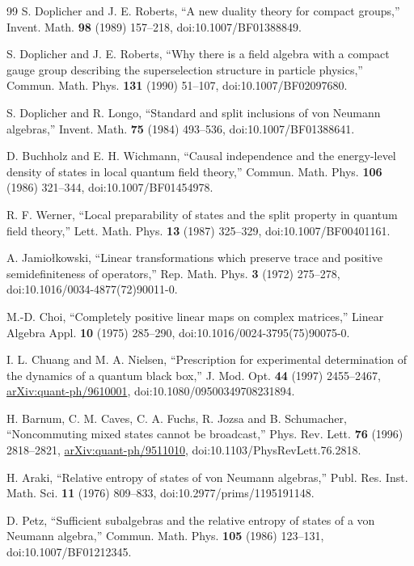 \documentclass[12pt]{article}
\theoremstyle{definition}
\theoremstyle{remark}
\begin{document}
\begin{thebibliography}{99}
S. Doplicher and J. E. Roberts,
``A new duality theory for compact groups,''
Invent. Math. \textbf{98} (1989) 157--218,
doi:10.1007/BF01388849.

S. Doplicher and J. E. Roberts,
``Why there is a field algebra with a compact gauge group describing the
superselection structure in particle physics,''
Commun. Math. Phys. \textbf{131} (1990) 51--107,
doi:10.1007/BF02097680.

S. Doplicher and R. Longo,
``Standard and split inclusions of von Neumann algebras,''
Invent. Math. \textbf{75} (1984) 493--536,
doi:10.1007/BF01388641.

D. Buchholz and E. H. Wichmann,
``Causal independence and the energy-level density of states in local quantum
field theory,'' Commun. Math. Phys. \textbf{106} (1986) 321--344,
doi:10.1007/BF01454978.

R. F. Werner,
``Local preparability of states and the split property in quantum field
theory,'' Lett. Math. Phys. \textbf{13} (1987) 325--329,
doi:10.1007/BF00401161.

A. Jamio\l{}kowski,
``Linear transformations which preserve trace and positive semidefiniteness of
operators,'' Rep. Math. Phys. \textbf{3} (1972) 275--278,
doi:10.1016/0034-4877(72)90011-0.

M.-D. Choi,
``Completely positive linear maps on complex matrices,''
Linear Algebra Appl. \textbf{10} (1975) 285--290,
doi:10.1016/0024-3795(75)90075-0.

I. L. Chuang and M. A. Nielsen,
``Prescription for experimental determination of the dynamics of a quantum
black box,'' J. Mod. Opt. \textbf{44} (1997) 2455--2467,
\href{https://arxiv.org/abs/quant-ph/9610001}{arXiv:quant-ph/9610001},
doi:10.1080/09500349708231894.

H. Barnum, C. M. Caves, C. A. Fuchs, R. Jozsa and B. Schumacher,
``Noncommuting mixed states cannot be broadcast,''
Phys. Rev. Lett. \textbf{76} (1996) 2818--2821,
\href{https://arxiv.org/abs/quant-ph/9511010}{arXiv:quant-ph/9511010},
doi:10.1103/PhysRevLett.76.2818.

H. Araki,
``Relative entropy of states of von Neumann algebras,''
Publ. Res. Inst. Math. Sci. \textbf{11} (1976) 809--833,
doi:10.2977/prims/1195191148.

D. Petz,
``Sufficient subalgebras and the relative entropy of states of a von Neumann
algebra,'' Commun. Math. Phys. \textbf{105} (1986) 123--131,
doi:10.1007/BF01212345.


\end{thebibliography}
\end{document}

